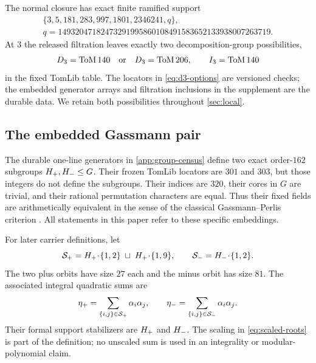 The normal closure has exact finite ramified support
\begin{equation}
 \begin{gathered}
 \{3,5,181,283,997,1801,2346241,q\},\\
 q=14932047182473291995860108491583652133938007263719.
 \end{gathered}
 \label{eq:released-support}
\end{equation}
At $3$ the released filtration leaves exactly two decomposition-group
possibilities,
\begin{equation}
 D_3=\mathrm{ToM}\,140\quad\text{or}\quad D_3=\mathrm{ToM}\,206,
 \qquad I_3=\mathrm{ToM}\,140
 \label{eq:d3-options}
\end{equation}
in the fixed TomLib table.  The locators in \eqref{eq:d3-options} are
versioned checks; the embedded generator arrays and filtration inclusions in
the supplement are the durable data.  We retain both possibilities throughout
\cref{sec:local}.

\subsection{The embedded Gassmann pair}

The durable one-line generators in \cref{app:group-census} define two exact
order-$162$ subgroups $H_{+},H_{-}\le G$.  Their frozen TomLib locators are
$301$ and $303$, but those integers do not define the subgroups.  Their
indices are $320$, their cores in $G$ are trivial, and their rational
permutation characters are equal.  Thus their fixed fields are arithmetically
equivalent in the sense of the classical Gassmann--Perlis criterion
\citep{perlis1977equation}.  All statements in this paper refer to these
specific embeddings.

For later carrier definitions, let
\begin{equation}
 \mathcal{S}_+=H_{+}\!\cdot\!\{1,2\}\;\sqcup\;
             H_{+}\!\cdot\!\{1,9\},
 \qquad
 \mathcal{S}_-=H_{-}\!\cdot\!\{1,2\}.
 \label{eq:basic-supports}
\end{equation}
The two plus orbits have size $27$ each and the minus orbit has size $81$.
The associated integral quadratic sums are
\begin{equation}
 \eta_+=\sum_{\{i,j\}\in\mathcal{S}_+}\alpha_i\alpha_j,
 \qquad
 \eta_-=\sum_{\{i,j\}\in\mathcal{S}_-}\alpha_i\alpha_j.
 \label{eq:eta-pm}
\end{equation}
Their formal support stabilizers are $H_{+}$ and $H_{-}$.  The scaling in
\eqref{eq:scaled-roots} is part of the definition; no unscaled sum is used in
an integrality or modular-polynomial claim.

